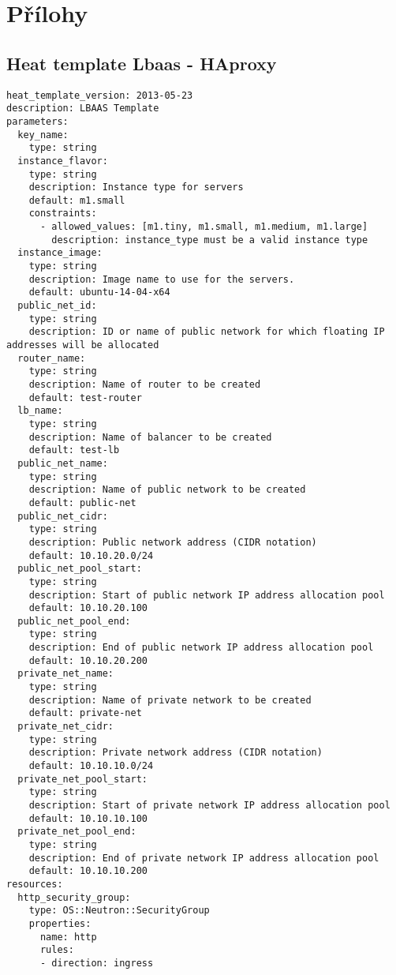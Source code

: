 \thispagestyle{empty}  \renewcommand{\appendixname}{P\v{r}iloha}%
\part*{Přílohy} %
\appendix
\chapter{Heat template Lbaas - HAproxy}

\begin{lstlisting}
heat_template_version: 2013-05-23
description: LBAAS Template
parameters:
  key_name:
    type: string
  instance_flavor:
    type: string
    description: Instance type for servers
    default: m1.small
    constraints:
      - allowed_values: [m1.tiny, m1.small, m1.medium, m1.large]
        description: instance_type must be a valid instance type
  instance_image:
    type: string
    description: Image name to use for the servers.
    default: ubuntu-14-04-x64
  public_net_id:
    type: string
    description: ID or name of public network for which floating IP addresses will be allocated
  router_name:
    type: string
    description: Name of router to be created
    default: test-router
  lb_name:
    type: string
    description: Name of balancer to be created
    default: test-lb
  public_net_name:
    type: string
    description: Name of public network to be created
    default: public-net
  public_net_cidr:
    type: string
    description: Public network address (CIDR notation)
    default: 10.10.20.0/24
  public_net_pool_start:
    type: string
    description: Start of public network IP address allocation pool
    default: 10.10.20.100
  public_net_pool_end:
    type: string
    description: End of public network IP address allocation pool
    default: 10.10.20.200
  private_net_name:
    type: string
    description: Name of private network to be created
    default: private-net
  private_net_cidr:
    type: string
    description: Private network address (CIDR notation)
    default: 10.10.10.0/24
  private_net_pool_start:
    type: string
    description: Start of private network IP address allocation pool
    default: 10.10.10.100
  private_net_pool_end:
    type: string
    description: End of private network IP address allocation pool
    default: 10.10.10.200
resources:
  http_security_group:
    type: OS::Neutron::SecurityGroup
    properties:
      name: http
      rules:
      - direction: ingress

\end{lstlisting}
